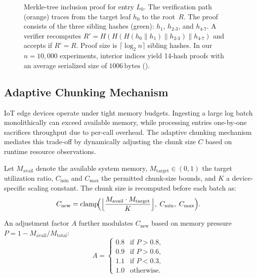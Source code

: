 \documentclass[preprint,12pt]{elsarticle}
\begin{document}
\begin{figure}[t]
{
}%
\caption{Merkle-tree inclusion proof for entry $L_0$.
The verification path (orange) traces from the target leaf $h_0$ to the root~$R$.
The proof consists of the three sibling hashes (green): $h_1$, $h_{2\text{-}3}$, and $h_{4\text{-}7}$.
A verifier recomputes $R' = H(H(H(h_0 \| h_1) \| h_{2\text{-}3}) \| h_{4\text{-}7})$ and accepts if $R' = R$.
Proof size is $\lceil \log_2 n \rceil$ sibling hashes.
In our $n = 10{,}000$ experiments, interior indices yield 14-hash proofs with an average serialized size of $1006\,\mathrm{bytes}$ ().}
\label{fig:merkle_proof}
\end{figure}


\subsection{Adaptive Chunking Mechanism}
\label{sec:chunking}

IoT edge devices operate under tight memory budgets.
Ingesting a large log batch monolithically can exceed available memory, while processing entries one-by-one sacrifices throughput due to per-call overhead.
The adaptive chunking mechanism mediates this trade-off by dynamically adjusting the chunk size $C$ based on runtime resource observations.

Let $M_{\text{avail}}$ denote the available system memory, $M_{\text{target}} \in (0,1)$ the target utilization ratio, $C_{\min}$ and $C_{\max}$ the permitted chunk-size bounds, and $K$ a device-specific scaling constant.
The chunk size is recomputed before each batch as:
\begin{equation}
  C_{\text{new}} = \mathrm{clamp}\!\Bigl(
    \Bigl\lfloor \frac{M_{\text{avail}} \cdot M_{\text{target}}}{K} \Bigr\rfloor,\;
    C_{\min},\; C_{\max}
  \Bigr).
  \label{eq:chunk}
\end{equation}

An adjustment factor $A$ further modulates $C_{\text{new}}$ based on memory pressure $P = 1 - M_{\text{avail}} / M_{\text{total}}$:
\begin{equation}
  A =
  \begin{cases}
    0.8 & \text{if } P > 0.8, \\
    0.9 & \text{if } P > 0.6, \\
    1.1 & \text{if } P < 0.3, \\
    1.0 & \text{otherwise}.
  \end{cases}
  \label{eq:adjust}
\end{equation}
\end{document}
